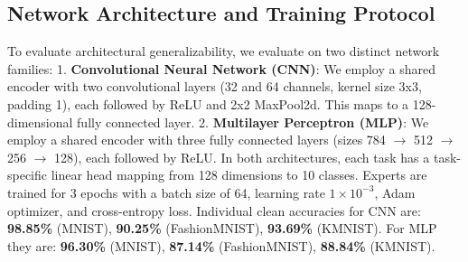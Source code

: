 \documentclass{article}
\theoremstyle{plain}
\theoremstyle{definition}
\theoremstyle{remark}
\begin{document}
\subsection{Network Architecture and Training Protocol}
To evaluate architectural generalizability, we evaluate on two distinct network families:
1. \textbf{Convolutional Neural Network (CNN)}: We employ a shared encoder with two convolutional layers (32 and 64 channels, kernel size 3x3, padding 1), each followed by ReLU and 2x2 MaxPool2d. This maps to a 128-dimensional fully connected layer.
2. \textbf{Multilayer Perceptron (MLP)}: We employ a shared encoder with three fully connected layers (sizes 784 $\to$ 512 $\to$ 256 $\to$ 128), each followed by ReLU.
In both architectures, each task has a task-specific linear head mapping from 128 dimensions to 10 classes. Experts are trained for 3 epochs with a batch size of 64, learning rate $1\times 10^{-3}$, Adam optimizer, and cross-entropy loss. Individual clean accuracies for CNN are: \textbf{98.85\%} (MNIST), \textbf{90.25\%} (FashionMNIST), \textbf{93.69\%} (KMNIST). For MLP they are: \textbf{96.30\%} (MNIST), \textbf{87.14\%} (FashionMNIST), \textbf{88.84\%} (KMNIST).
\end{document}
